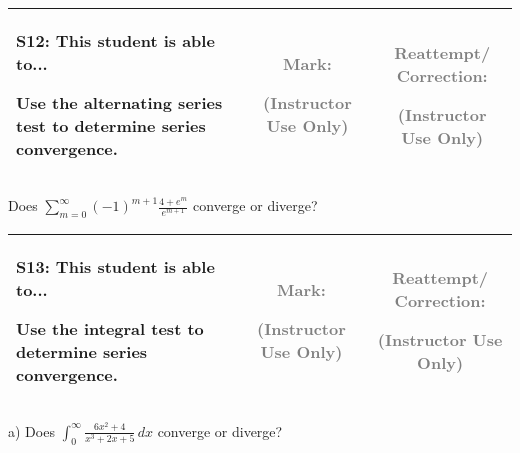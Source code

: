 \documentclass[12pt]{article}
\newcommand{\standardQuestion}[2]{
\newpage
\begin{center}
  \begin{tabular}{|l|c|c|}
  \hline
    \parbox{4in}{
      \textbf{#1}: This student is able to...\\
      #2
    }
  &
    \parbox{1in}{
      \vspace{0.1in}
      \footnotesize \textcolor{gray}{Mark:}
      \vspace{0.7in}

      \tiny \textcolor{gray}{(Instructor Use Only)}
    }
  &
    \parbox{1in}{
      \vspace{0.1in}
      \footnotesize \textcolor{gray}{Reattempt/ Correction:}
      \vspace{0.53in}

      \tiny \textcolor{gray}{(Instructor Use Only)}
    }
  \\\hline
  \end{tabular}
\end{center}
}
\begin{document}
%



%
%
%
%
%
%
%
%
%
%
%



%
%
%
%
%
%
%
%
%
%
%
%



\standardQuestion{S12}{
  Use the alternating series test to determine series convergence.
}

Does \(\sum_{m=0}^\infty(-1)^{m+1}\frac{4+e^m}{e^{m+1}}\) converge or diverge?



\standardQuestion{S13}{
  Use the integral test to determine series convergence.
}

a) Does \(\int_0^\infty \frac{6x^2+4}{x^3+2x+5}\,dx\) converge or diverge?
\end{document}
